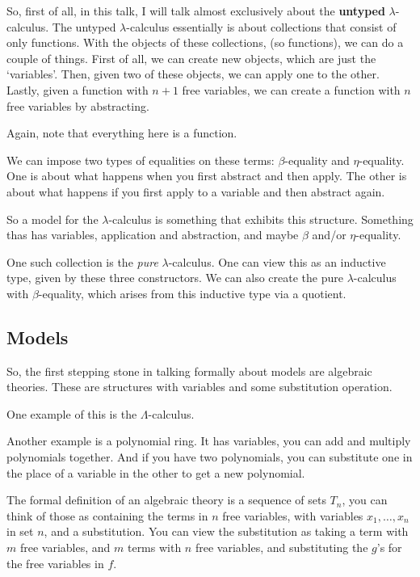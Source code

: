 \documentclass{amsart}
\begin{document}
  So, first of all, in this talk, I will talk almost exclusively about the \textbf{untyped} $ \lambda $-calculus. The untyped $ \lambda $-calculus essentially is about collections that consist of only functions. With the objects of these collections, (so functions), we can do a couple of things. First of all, we can create new objects, which are just the `variables'. Then, given two of these objects, we can apply one to the other. Lastly, given a function with $ n + 1 $ free variables, we can create a function with $ n $ free variables by abstracting.

  Again, note that everything here is a function.

  We can impose two types of equalities on these terms: $ \beta $-equality and $ \eta $-equality. One is about what happens when you first abstract and then apply. The other is about what happens if you first apply to a variable and then abstract again.

  So a model for the $ \lambda $-calculus is something that exhibits this structure. Something thas has variables, application and abstraction, and maybe $ \beta $ and/or $ \eta $-equality.

  One such collection is the \textit{pure} $ \lambda $-calculus. One can view this as an inductive type, given by these three constructors. We can also create the pure $ \lambda $-calculus with $ \beta $-equality, which arises from this inductive type via a quotient.

  \subsection{Models}

  So, the first stepping stone in talking formally about models are algebraic theories. These are structures with variables and some substitution operation.

  One example of this is the $ \Lambda $-calculus.

  Another example is a polynomial ring. It has variables, you can add and multiply polynomials together. And if you have two polynomials, you can substitute one in the place of a variable in the other to get a new polynomial.

  The formal definition of an algebraic theory is a sequence of sets $ T_n $, you can think of those as containing the terms in $ n $ free variables, with variables $ x_1, \dots, x_n $ in set $ n $, and a substitution. You can view the substitution as taking a term with $ m $ free variables, and $ m $ terms with $ n $ free variables, and substituting the $ g $'s for the free variables in $ f $.
\end{document}
